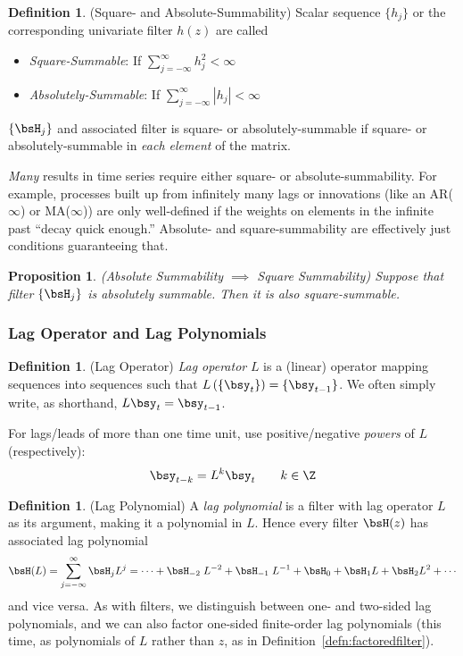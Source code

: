 \documentclass[12pt]{article}
\theoremstyle{plain}
\newtheorem{prop}[thm]{Proposition}
\theoremstyle{definition}
\newtheorem{defn}[thm]{Definition}
\theoremstyle{remark}
\begin{document}
\begin{defn}(Square- and Absolute-Summability)
Scalar sequence $\{h_j\}$ or the corresponding univariate filter $h(z)$
are called
\begin{itemize}
  \item \emph{Square-Summable}: If $\sum_{j=-\infty}^\infty h_j^2<\infty$
  \item \emph{Absolutely-Summable}: If $\sum_{j=-\infty}^\infty |h_j|<\infty$
\end{itemize}
$\{\bsH_j\}$ and associated filter is square- or
absolutely-summable if square- or absolutely-summable in
\emph{each element} of the matrix.

\emph{Many} results in time series require either square- or
absolute-summability.
For example, processes built up from infinitely many lags or innovations
(like an AR($\infty$) or MA($\infty$)) are only well-defined if the
weights on elements in the infinite past ``decay quick enough.''
Absolute- and square-summability are effectively just conditions
guaranteeing that.
\end{defn}

\begin{prop}\emph{(Absolute Summability $\implies$ Square Summability)}
Suppose that filter $\{\bsH_j\}$ is absolutely summable. Then it is also
square-summable.
\end{prop}

\clearpage
\subsubsection{Lag Operator and Lag Polynomials}

\begin{defn}(Lag Operator)
\emph{Lag operator} $L$ is a (linear) operator mapping sequences into
sequences such that $L\left(\{\bsy_t\}\right)=\{\bsy_{t-1}\}$. We often
simply write, as shorthand, $L\bsy_t=\bsy_{t-1}$.

For lags/leads of more than one time unit, use positive/negative
\emph{powers} of $L$ (respectively):
\begin{align*}
  \bsy_{t-k} = L^k \bsy_t
  \qquad k\in\Z
\end{align*}
\end{defn}

\begin{defn}(Lag Polynomial)
A \emph{lag polynomial} is a filter with lag operator $L$ as its
argument, making it a polynomial in $L$. Hence every filter $\bsH(z)$
has associated lag polynomial
\begin{align*}
  \bsH(L) = \sum_{j=-\infty}^\infty \bsH_j L^j
  = \cdots + \bsH_{-2}\;L^{-2} + \bsH_{-1}\;L^{-1} +
    \bsH_0 + \bsH_1 L + \bsH_2L^2 + \cdots
\end{align*}
and vice versa.
As with filters, we distinguish between one- and two-sided lag
polynomials, and we can also factor one-sided finite-order lag
polynomials (this time, as polynomials of $L$ rather than $z$, as in
Definition~\ref{defn:factoredfilter}).
\end{defn}
\end{document}

